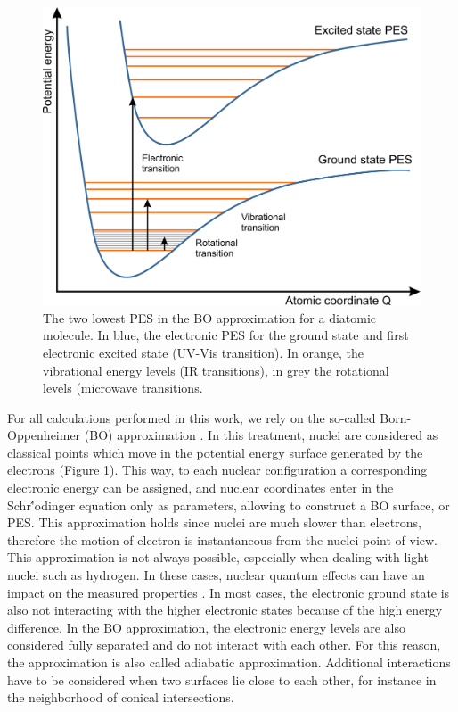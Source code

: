 \begin{figure}[!htbp]
	\centering
 	\includegraphics[width=1.0\textwidth]{BO-approx}
	\caption{The two lowest PES in the BO approximation for a diatomic molecule. In blue, the electronic PES for the ground state and first electronic excited state (UV-Vis transition). In orange, the vibrational energy levels (IR transitions), in grey the rotational levels (microwave transitions.}
	\label{fig:BO-approx}
\end{figure}

For all calculations performed in this work, we rely on the so-called Born-Oppenheimer (BO) approximation \cite{Born1927}. In this treatment, nuclei are considered as classical points which move in the potential energy surface generated by the electrons (Figure \ref{fig:BO-approx}). This way, to each nuclear configuration a corresponding electronic energy can be assigned, and nuclear coordinates enter in the Schr\''odinger equation only as parameters, allowing to construct a BO surface, or PES. This approximation holds since nuclei are much slower than electrons, therefore the motion of electron is instantaneous from the nuclei point of view. 
This approximation is not always possible, especially when dealing with light nuclei such as hydrogen. In these cases, nuclear quantum effects can have an impact on the measured properties \cite{Ceriotti2016}. In most cases, the electronic ground state is also not interacting with the higher electronic states because of the high energy difference. In the BO approximation, the electronic energy levels are also considered fully separated and do not interact with each other. For this reason, the approximation is also called adiabatic approximation. Additional interactions have to be considered when two surfaces lie close to each other, for instance in the neighborhood of conical intersections. 

